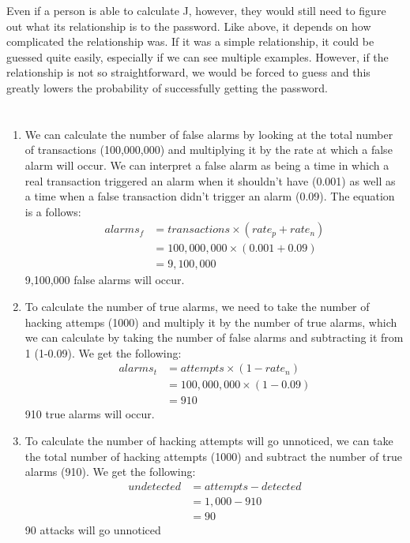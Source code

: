 \documentclass[letterpaper]{article}
\begin{document}
Even if a person is able to calculate J, however, they would still need to figure out what its relationship is to the password. Like above, it depends on how complicated the relationship was. If it was a simple relationship, it could be guessed quite easily, especially if we can see multiple examples. However, if the relationship is not so straightforward, we would be forced to guess and this greatly lowers the probability of successfully getting the password.

\newpage
\section{}

\begin{enumerate}[label=\alph*.]
    \item We can calculate the number of false alarms by looking at the total number of transactions (100,000,000) and multiplying it by the rate at which a false alarm will occur. We can interpret a false alarm as being a time in which a real transaction triggered an alarm when it shouldn't have (0.001) as well as a time when a false transaction didn't trigger an alarm (0.09). The equation is a follows: 
    \begin{align}
    alarms_f &= transactions \times (rate_p + rate_n)\\
        &= 100,000,000 \times (0.001 + 0.09) \\
        &= 9,100,000
    \end{align}
    9,100,000 false alarms will occur.
    
    \item To calculate the number of true alarms, we need to take the number of hacking attemps (1000) and multiply it by the number of true alarms, which we can calculate by taking the number of false alarms and subtracting it from 1 (1-0.09). We get the following:
    \begin{align}
    alarms_t &= attempts \times (1 - rate_n)\\
        &= 100,000,000 \times (1 - 0.09) \\
        &= 910
    \end{align}
    910 true alarms will occur.
    
    \item To calculate the number of hacking attempts will go unnoticed, we can take the total number of hacking attempts (1000) and subtract the number of true alarms (910). We get the following:
    \begin{align}
    undetected &= attempts - detected\\
        &= 1,000 - 910 \\
        &= 90
    \end{align}
    90 attacks will go unnoticed
\end{enumerate}
\end{document}
